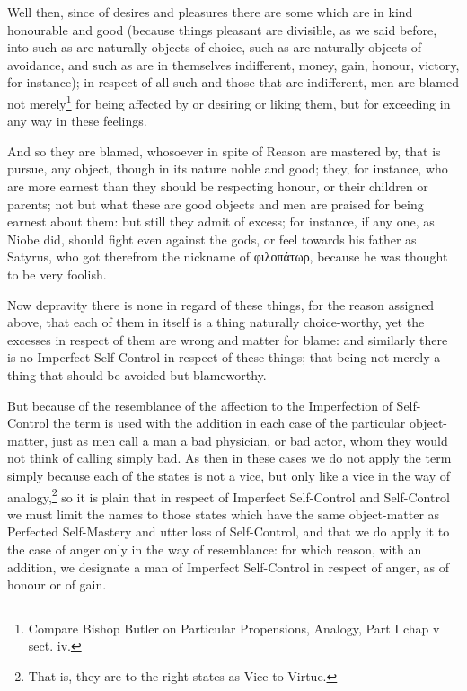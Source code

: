 Well then, since of desires and pleasures there are some which are in kind
honourable and good (because things pleasant are divisible, as we said before,
into such as are naturally objects of choice, such as are naturally objects of
avoidance, and such as are in themselves indifferent, money, gain, honour,
victory, for instance); in respect of all such and those that are indifferent,
men are blamed not merely\footnote{Compare Bishop Butler on Particular Propensions, Analogy, Part I chap v sect.
iv.}
for being affected by or desiring or liking them, but for exceeding in any way
in these feelings.

And so they are blamed, whosoever in spite of Reason are mastered by, that is
pursue, any object, though in its nature noble and good; they, for instance,
who are more earnest than they should be respecting honour, or their children
or parents; not but what these are good objects and men are praised for being
earnest about them: but still they admit of excess; for instance, if any one,
as Niobe did, should fight even against the gods, or feel towards his father as
Satyrus, who got therefrom the nickname of
φιλοπάτωρ, because he was thought
to be very foolish.

Now depravity there is none in regard of these things, for the reason assigned
above, that each of them in itself is a thing naturally choice-worthy, yet the
excesses in respect of them are wrong and matter for blame: and similarly there
is no Imperfect Self-Control in respect of these things; that being not merely
a thing that should be avoided but blameworthy.

But because of the resemblance of the affection to the Imperfection of
Self-Control the term is used with the addition in each case of the particular
object-matter, just as men call a man a bad physician, or bad actor, whom they
would not think of calling simply bad. As then in these cases we do not apply
the term simply because each of the states is not a vice, but only like a vice
in the way of analogy,\footnote{That is, they are to the right states as Vice to Virtue.}
so it is plain that in respect of Imperfect Self-Control and Self-Control we
must limit the names to those states which have the same object-matter as
Perfected Self-Mastery and utter loss of Self-Control, and that we do apply it
to the case of anger only in the way of resemblance: for which reason, with an
addition, we designate a man of Imperfect Self-Control in respect of anger, as
of honour or of gain.


